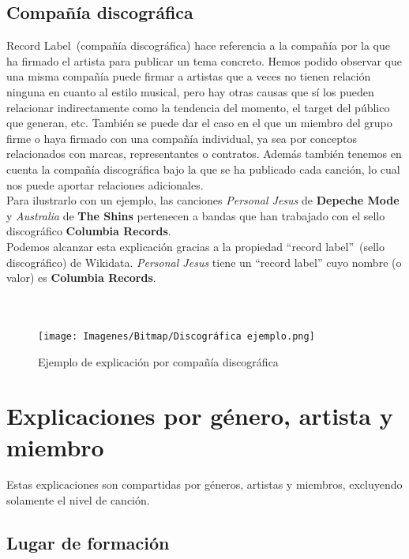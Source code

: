 \subsection*{Compañía discográfica}

Record Label~(compañía discográfica) hace referencia a la compañía por la que ha firmado el artista para publicar un tema concreto. Hemos podido observar que una misma compañía puede firmar a artistas que a veces no tienen relación ninguna en cuanto al estilo musical, pero hay otras causas que sí los pueden relacionar indirectamente como la tendencia del momento, el target del público que generan, etc. También se puede dar el caso en el que un miembro del grupo firme o haya firmado con una compañía individual, ya sea por conceptos relacionados con marcas, representantes o contratos. Además también tenemos en cuenta la compañía discográfica bajo la que se ha publicado cada canción, lo cual nos puede aportar relaciones adicionales.\\

Para ilustrarlo con un ejemplo, las canciones \textit{Personal Jesus} de \textbf{Depeche Mode} y \textit{Australia} de \textbf{The Shins} pertenecen a bandas que han trabajado con el sello discográfico \textbf{Columbia Records}.\\

Podemos alcanzar esta explicación gracias a la propiedad ``record label''~(sello discográfico) de Wikidata. \textit{Personal Jesus} tiene un ``record label'' cuyo nombre (o valor) es \textbf{Columbia Records}.\\\\\

\begin{figure}[h!]
	\centering
	\texttt{[image: Imagenes/Bitmap/Discográfica ejemplo.png]}
	\caption{Ejemplo de explicación por compañía discográfica}
	\label{fig:sampleImage}
\end{figure}

\clearpage

\section{Explicaciones por género, artista y miembro}

Estas explicaciones son compartidas por géneros, artistas y miembros, excluyendo solamente el nivel de canción.\\

\subsection*{Lugar de formación}

